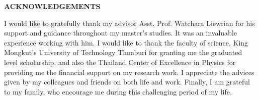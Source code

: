 
\vspace*{0.5cm} \centerline{\Large\bf ACKNOWLEDGEMENTS}
\vspace{1.5cm}
\noindent 
I would like to gratefully thank my advisor Asst. Prof. Watchara Liewrian for his support and guidance throughout my master's studies.
It was an invaluable experience working with him.
I would like to thank the faculty of science, King Mongkut's University of Technology Thonburi for granting me the graduated level scholarship,
and also the Thailand Center of Excellence in Physics for providing me the financial support on my research work. 
I appreciate the advices given by my colleagues and friends on both life and work.
Finally, I am grateful to my family, who encourage me during this challenging period of my life.
